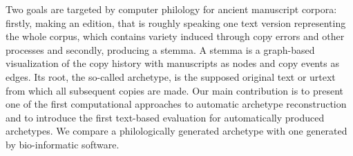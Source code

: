 Two goals are targeted by computer philology for ancient manuscript corpora: firstly, making an edition, that is roughly speaking one text version representing the whole corpus, which contains variety induced through copy errors and other processes and secondly, producing a stemma. A stemma is a graph-based visualization of the copy history with manuscripts as nodes and copy events as edges. Its root, the so-called archetype, is the supposed original text or urtext from which all subsequent copies are made. Our main contribution is to present one of the first computational approaches to automatic archetype reconstruction and to introduce the first text-based evaluation for automatically produced archetypes. We compare a philologically generated archetype with one generated by bio-informatic software.
